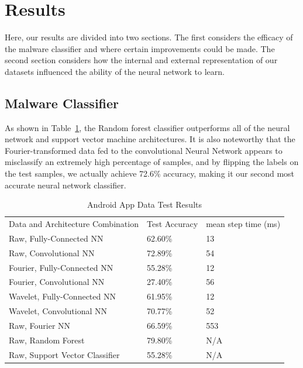 \documentclass[10pt]{article}
\begin{document}
\section{Results}
Here, our results are divided into two sections. 
The first considers the efficacy of the malware classifier and where certain improvements could be made.
The second section considers how the internal and external representation of our datasets influenced the ability of the neural network to learn.

\subsection{Malware Classifier} \label{malware classifier}
As shown in Table~\ref{Tab:test}, the Random forest classifier outperforms all of the neural network and support vector machine architectures.
It is also noteworthy that the Fourier-transformed data fed to the convolutional Neural Network appears to misclassify an extremely high percentage of samples, and by flipping the labels on the test samples, we actually achieve 72.6\% accuracy, making it our second most accurate neural network classifier.

 
\begin{table}[ht]
\caption{Android App Data Test Results}
\centering
\label{Tab:test}	
\begin{tabular}{lll}
Data and Architecture Combination & Test Accuracy & mean step time (ms) \\
Raw, Fully-Connected NN           & 62.60\%         & 13                  \\
Raw, Convolutional NN             & 72.89\%         & 54                  \\
Fourier, Fully-Connected NN       & 55.28\%         & 12                  \\
Fourier, Convolutional NN         & 27.40\%         & 56                  \\
Wavelet, Fully-Connected NN       & 61.95\%         & 12                  \\
Wavelet, Convolutional NN         & 70.77\%         & 52                  \\
Raw, Fourier NN                   & 66.59\%         & 553                 \\
Raw, Random Forest                & 79.80\%         & N/A                 \\
Raw, Support Vector Classifier    & 55.28\%         & N/A                
\end{tabular}
\end{table}
 
\end{document}
